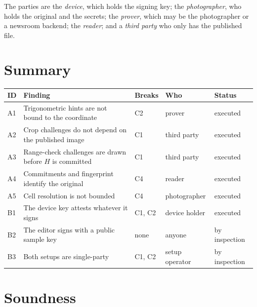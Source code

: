 \documentclass[11pt,a4paper]{article}
\begin{document}
The parties are the \emph{device}, which holds the signing key; the
\emph{photographer}, who holds the original and the secrets; the \emph{prover},
which may be the photographer or a newsroom backend; the \emph{reader}; and a
\emph{third party} who only has the published file.

\section{Summary}

\begin{table}[H]
\small
\begin{tabularx}{\textwidth}{@{}l X l l l@{}}
\toprule
ID & Finding & Breaks & Who & Status \\
\midrule
A1 & Trigonometric hints are not bound to the coordinate & C2 & prover & executed \\
A2 & Crop challenges do not depend on the published image & C1 & third party & executed \\
A3 & Range-check challenges are drawn before $H$ is committed & C1 & third party & executed \\
A4 & Commitments and fingerprint identify the original & C4 & reader & executed \\
A5 & Cell resolution is not bounded & C4 & photographer & executed \\
B1 & The device key attests whatever it signs & C1, C2 & device holder & executed \\
B2 & The editor signs with a public sample key & none & anyone & by inspection \\
B3 & Both setups are single-party & C1, C2 & setup operator & by inspection \\
\bottomrule
\end{tabularx}
\end{table}

\section{Soundness}
\end{document}
